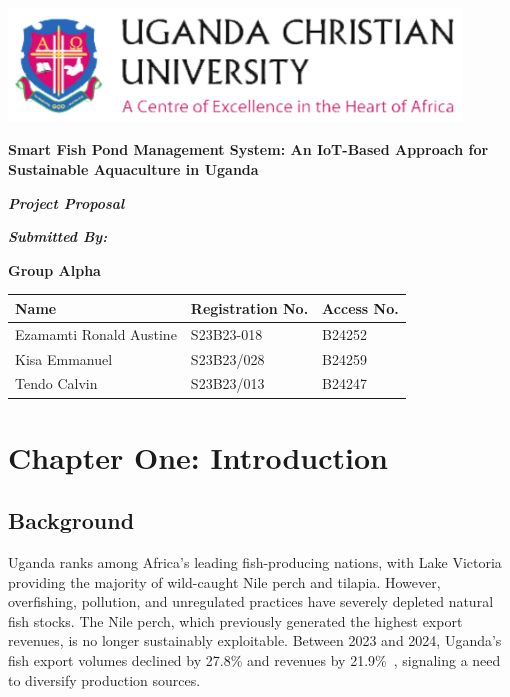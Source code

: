 \documentclass[12pt,a4paper]{report}
\begin{document}
\begin{titlepage}
    \centering
    \includegraphics[width=0.9\textwidth]{img/UCU.png}\\[1cm]
    {\Huge\bfseries Smart Fish Pond Management System: An IoT-Based Approach for Sustainable Aquaculture in Uganda \par}
    \vspace{1.5cm}
    {\LARGE\itshape\textbf{Project Proposal}\par}
    \vspace{1.0cm}
    

    {\Large\itshape\textbf{Submitted By:}\par}
    \vspace{0.8cm}

    {\Large\textbf{Group Alpha}}
    \vspace{0.5cm}

    \renewcommand{\arraystretch}{1.3}
    \begin{tabular}{|p{5cm}|p{3.5cm}|p{3.5cm}|}
        \hline
        \rowcolor{gray!25}\textbf{Name} & \textbf{Registration No.} & \textbf{Access No.} \\
        \hline
        Ezamamti Ronald Austine & S23B23-018 & B24252 \\
        \hline
        Kisa Emmanuel  & S23B23/028 & B24259\\
        \hline
        Tendo Calvin & S23B23/013 & B24247\\
        \hline
    \end{tabular}

\end{titlepage}

\tableofcontents
\clearpage

\chapter{Chapter One: Introduction}
\section{Background}
Uganda ranks among Africa’s leading fish-producing nations, with Lake Victoria providing the majority of wild-caught Nile perch and tilapia. However, overfishing, pollution, and unregulated practices have severely depleted natural fish stocks. The Nile perch, which previously generated the highest export revenues, is no longer sustainably exploitable. Between 2023 and 2024, Uganda’s fish export volumes declined by 27.8\% and revenues by 21.9\%~\cite{DailyMonitor2025}, signaling a need to diversify production sources.
\end{document}
